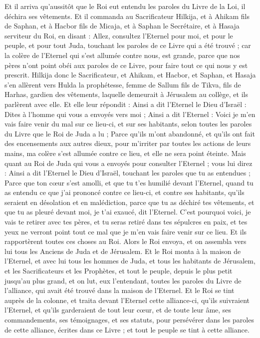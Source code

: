 \begin{multicols}{2}
Et il arriva qu'aussitôt que le Roi eut entendu les paroles du Livre de la Loi, il déchira ses vêtements.
Et il commanda au Sacrificateur Hilkija, et à Ahikam fils de Saphan, et à Hacbor fils de Micaja, et à Saphan le Secrétaire, et à Hasaja serviteur du Roi, en disant :
Allez, consultez l'Eternel pour moi, et pour le peuple, et pour tout Juda, touchant les paroles de ce Livre qui a été trouvé ; car la colère de l'Eternel qui s'est allumée contre nous, est grande, parce que nos pères n'ont point obéi aux paroles de ce Livre, pour faire tout ce qui nous y est prescrit.
Hilkija donc le Sacrificateur, et Ahikam, et Hacbor, et Saphan, et Hasaja s'en allèrent vers Hulda la prophétesse, femme de Sallum fils de Tikva, fils de Harhas, gardien des vêtements, laquelle demeurait à Jérusalem au collège, et ils parlèrent avec elle.
Et elle leur répondit : Ainsi a dit l'Eternel le Dieu d'Israël : Dites à l'homme qui vous a envoyés vers moi ;
Ainsi a dit l'Eternel : Voici je m'en vais faire venir du mal sur ce lieu-ci, et sur ses habitants, selon toutes les paroles du Livre que le Roi de Juda a lu ;
Parce qu'ils m'ont abandonné, et qu'ils ont fait des encensements aux autres dieux, pour m'irriter par toutes les actions de leurs mains, ma colère s'est allumée contre ce lieu, et elle ne sera point éteinte.
Mais quant au Roi de Juda qui vous a envoyés pour consulter l'Eternel ; vous lui direz : Ainsi a dit l'Eternel le Dieu d'Israël, touchant les paroles que tu as entendues ;
Parce que ton cœur s'est amolli, et que tu t'es humilié devant l'Eternel, quand tu as entendu ce que j'ai prononcé contre ce lieu-ci, et contre ses habitants, qu'ils seraient en désolation et en malédiction, parce que tu as déchiré tes vêtements, et que tu as pleuré devant moi, je t'ai exaucé, dit l'Eternel.
C'est pourquoi voici, je vais te retirer avec tes pères, et tu seras retiré dans tes sépulcres en paix, et tes yeux ne verront point tout ce mal que je m'en vais faire venir sur ce lieu. Et ils rapportèrent toutes ces choses au Roi.
\VerseOne{}Alors le Roi envoya, et on assembla vers lui tous les Anciens de Juda et de Jérusalem.
Et le Roi monta à la maison de l'Eternel, et avec lui tous les hommes de Juda, et tous les habitants de Jérusalem, et les Sacrificateurs et les Prophètes, et tout le peuple, depuis le plus petit jusqu'au plus grand, et on lut, eux l'entendant, toutes les paroles du Livre de l'alliance, qui avait été trouvé dans la maison de l'Eternel.
Et le Roi se tint auprès de la colonne, et traita devant l'Eternel cette alliance-ci, qu'ils suivraient l'Eternel, et qu'ils garderaient de tout leur cœur, et de toute leur âme, ses commandements, ses témoignages, et ses statuts, pour persévérer dans les paroles de cette alliance, écrites dans ce Livre ; et tout le peuple se tint à cette alliance.

\end{multicols}
